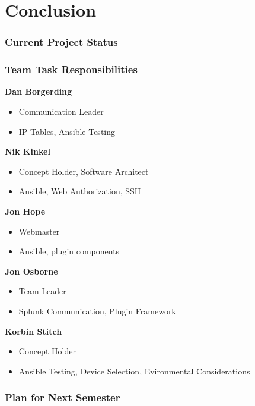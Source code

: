\section{Conclusion}

\begin{frame}
\frametitle{Current Project Status}


\end{frame}

\begin{frame}
\frametitle{Team Task Responsibilities}

\textbf{Dan Borgerding}
\begin{itemize}
\item Communication Leader
\item IP-Tables, Ansible Testing\end{itemize}

\textbf{Nik Kinkel}
\begin{itemize}
\item Concept Holder, Software Architect
\item Ansible, Web Authorization, SSH \end{itemize}


\textbf{Jon Hope}
\begin{itemize}
\item Webmaster
\item Ansible, plugin components
\end{itemize}

\textbf{Jon Osborne}
\begin{itemize}
\item Team Leader
\item Splunk Communication, Plugin Framework
\end{itemize}

\textbf{Korbin Stitch}
\begin{itemize}
\item Concept Holder
\item  Ansible Testing, Device Selection, Evironmental Considerations
\end{itemize}



\end{frame}


\begin{frame}
\frametitle{Plan for Next Semester}


\end{frame}
